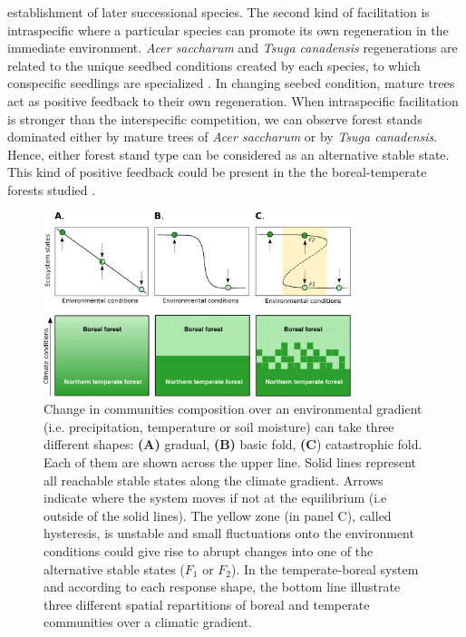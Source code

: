 establishment of later successional species.  The second kind of facilitation is
intraspecific where a particular species can promote its own regeneration in the
immediate environment. \textit{Acer saccharum} and \textit{Tsuga canadensis}
regenerations are related to the unique seedbed conditions created by each
species, to which conspecific seedlings are specialized
\cite{Society2014,McCarthyNeumann2012}. In changing seebed condition, mature
trees act as positive feedback to their own regeneration. When intraspecific
facilitation is stronger than the interspecific competition, we can observe
forest stands dominated either by mature trees of \textit{Acer saccharum} or by
\textit{Tsuga canadensis}. Hence, either forest stand type can be considered as
an alternative stable state. This kind of positive feedback could be present in
the the boreal-temperate forests studied  \cite{Barras1998,Society2014}. \\


\begin{figure}[t]
	\begin{center}
	\includegraphics[width=0.8\textwidth]{fig/states.pdf}
	\end{center}
	\caption{Change in communities composition over an environmental gradient (i.e. precipitation, temperature or soil moisture) can take three different shapes: \textbf{(A)} gradual, \textbf{(B)} basic fold,
	\textbf{(C}) catastrophic fold. Each of them are shown across the upper
	line. Solid lines represent all reachable stable states along the climate gradient.  Arrows indicate
	where the system moves if not at the equilibrium (i.e outside of the solid lines). The yellow zone (in panel C),
	called hysteresis, is unstable and small fluctuations onto the environment
	conditions could give rise to abrupt changes into one of the alternative
	stable states ($F_1$ or $F_2$). In the temperate-boreal system and according to each response shape, the bottom line illustrate three different spatial repartitions of boreal and temperate communities over a climatic gradient.}
	\label{fig1}
	\vspace{-1em}
\end{figure}

